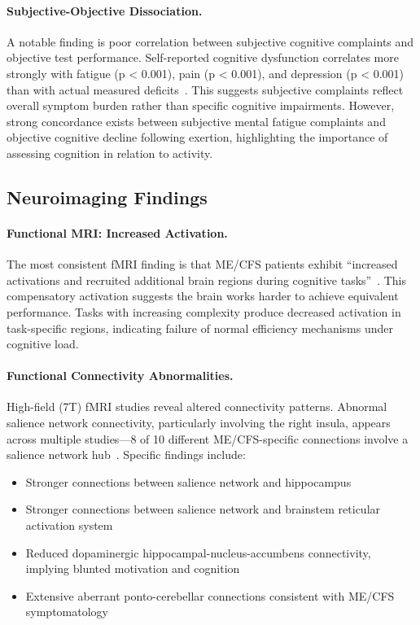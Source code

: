 \paragraph{Subjective-Objective Dissociation.}
A notable finding is poor correlation between subjective cognitive complaints and objective test performance. Self-reported cognitive dysfunction correlates more strongly with fatigue (p < 0.001), pain (p < 0.001), and depression (p < 0.001) than with actual measured deficits~\cite{MCAM2024cognitive}. This suggests subjective complaints reflect overall symptom burden rather than specific cognitive impairments. However, strong concordance exists between subjective mental fatigue complaints and objective cognitive decline following exertion, highlighting the importance of assessing cognition in relation to activity.

\subsection{Neuroimaging Findings}
\label{subsec:neuroimaging}

\paragraph{Functional MRI: Increased Activation.}
The most consistent fMRI finding is that ME/CFS patients exhibit ``increased activations and recruited additional brain regions during cognitive tasks''~\cite{Shan2020neuroimaging}. This compensatory activation suggests the brain works harder to achieve equivalent performance. Tasks with increasing complexity produce decreased activation in task-specific regions, indicating failure of normal efficiency mechanisms under cognitive load.

\paragraph{Functional Connectivity Abnormalities.}
High-field (7T) fMRI studies reveal altered connectivity patterns. Abnormal salience network connectivity, particularly involving the right insula, appears across multiple studies---8 of 10 different ME/CFS-specific connections involve a salience network hub~\cite{Shan2020neuroimaging}. Specific findings include:
\begin{itemize}
    \item Stronger connections between salience network and hippocampus
    \item Stronger connections between salience network and brainstem reticular activation system
    \item Reduced dopaminergic hippocampal-nucleus-accumbens connectivity, implying blunted motivation and cognition~\cite{Faro2024connectivity}
    \item Extensive aberrant ponto-cerebellar connections consistent with ME/CFS symptomatology
\end{itemize}

